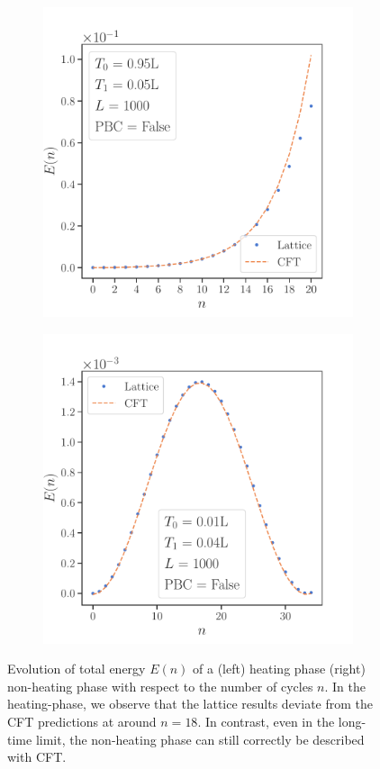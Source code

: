 \documentclass[11pt, a4paper, oneside]{book}
\theoremstyle{definition} %
\begin{document}
\begin{figure}
\centering
\begin{subfigure}[t]{0.49\textwidth}
	\centering
	\includegraphics[width =\textwidth]{TotalEnergyHeating}
	\end{subfigure}
\begin{subfigure}[t]{0.49\textwidth}
	\centering
	\includegraphics[width =\textwidth]{TotalEnergyNonHeating}
\end{subfigure}
\caption{Evolution of total energy $E(n)$ of a (left) heating phase (right) non-heating phase with respect to the number of cycles $n$. In the heating-phase, we observe that the lattice results deviate from the CFT predictions at around $n=18$. In contrast, even in the long-time limit, the non-heating phase can still correctly be described with CFT.}
\label{eq:Evolution_of_total_energy}
\end{figure}
\end{document}
